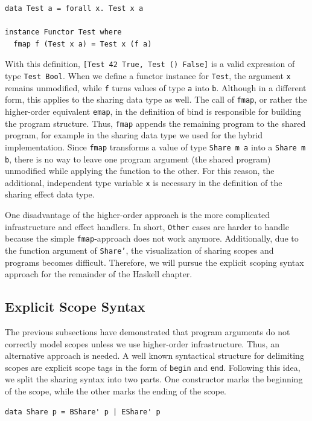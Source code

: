 \documentclass[a4paper, 11pt, fleqn, twoside]{scrreprt}
\newcommand{\hinl}[1]{\texttt{#1}}
\begin{document}
\begin{verbatim}
data Test a = forall x. Test x a

instance Functor Test where
  fmap f (Test x a) = Test x (f a)
\end{verbatim}

With this definition, \hinl{[Test 42 True, Test () False]} is a valid expression of type \hinl{Test Bool}.
When we define a functor instance for \hinl{Test}, the argument \hinl{x} remains unmodified, while \hinl{f} turns values of type \hinl{a} into \hinl{b}.
Although in a different form, this applies to the sharing data type as well.
The call of \hinl{fmap}, or rather the higher-order equivalent \hinl{emap}, in the definition of bind is responsible for building the program structure.
Thus, \hinl{fmap} appends the remaining program to the shared program, for example in the sharing data type we used for the hybrid implementation.
Since \hinl{fmap} transforms a value of type \hinl{Share m a} into a \hinl{Share m b}, there is no way to leave one program argument (the shared program) unmodified while applying the function to the other.
For this reason, the additional, independent type variable \hinl{x} is necessary in the definition of the sharing effect data type.

One disadvantage of the higher-order approach is the more complicated infrastructure and effect handlers.
In short, \hinl{Other} cases are harder to handle because the simple \hinl{fmap}-approach does not work anymore.
Additionally, due to the function argument of \hinl{Share'}, the visualization of sharing scopes and programs becomes difficult.
Therefore, we will pursue the explicit scoping syntax approach for the remainder of the Haskell chapter.

\subsection{Explicit Scope Syntax}
\label{subsec:explicit}
The previous subsections have demonstrated that program arguments do not correctly model scopes unless we use higher-order infrastructure.
Thus, an alternative approach is needed.
A well known syntactical structure for delimiting scopes are explicit scope tags in the form of \hinl{begin} and \hinl{end}.
Following this idea, we split the sharing syntax into two parts.
One constructor marks the beginning of the scope, while the other marks the ending of the scope.

\begin{verbatim}
data Share p = BShare' p | EShare' p
\end{verbatim}
\end{document}

